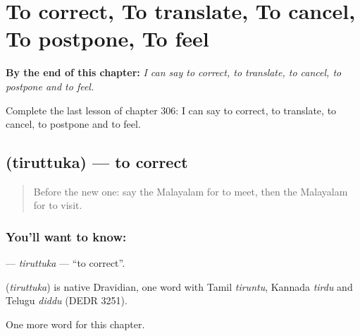 
\chapter{To correct, To translate, To cancel, To postpone, To feel}
\label{ch:ml-to-correct-to-translate-to-cancel-to-postpone-to-feel}

\begin{chapteropening}
\textbf{By the end of this chapter:} \emph{I can say to correct, to translate, to cancel, to postpone and to feel.}

Complete the last lesson of chapter 306: I can say to correct, to translate, to cancel, to postpone and to feel.
\end{chapteropening}

\section[\texorpdfstring{\ml{തിരുത്തുക} (tiruttuka)}{തിരുത്തുക (tiruttuka)}]{ (tiruttuka) — to correct}

\label{lesson:ML-C306-tiruttuka}



\begin{quote}
Before the new one: say the Malayalam for to meet, then the Malayalam for to visit.
\end{quote}

\subsection*{You'll want to know: }
\textbf{} — \emph{tiruttuka} — \textquotedblleft{}to correct\textquotedblright{}.

\begin{cousinweb}
\textbf{} (\emph{tiruttuka}) is native Dravidian, one word with Tamil \emph{tiruntu}, Kannada \emph{tirdu} and Telugu \emph{diddu} (DEDR 3251).
\end{cousinweb}

\begin{grammarlens}[title={What you've built}]
One more word for this chapter.
\end{grammarlens}

